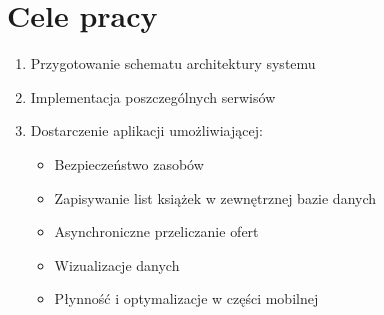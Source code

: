 
\section{Cele pracy}
\label{sec:celePracy}
\begin{enumerate}
    \item Przygotowanie schematu architektury systemu
    \item Implementacja poszczególnych serwisów
    \item Dostarczenie aplikacji umożliwiającej: 
    \begin{itemize}
        \item Bezpieczeństwo zasobów
        \item Zapisywanie list książek w zewnętrznej bazie danych 
        \item Asynchroniczne przeliczanie ofert
        \item Wizualizacje danych
        \item Płynność i optymalizacje w części mobilnej
    \end{itemize}
\end{enumerate}


